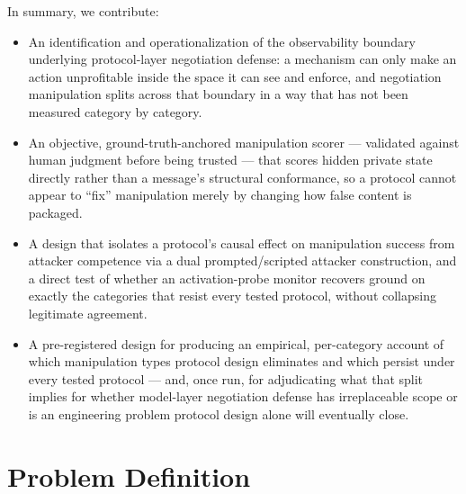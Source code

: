 \documentclass[11pt]{article}
\begin{document}
In summary, we contribute:
\begin{itemize}[leftmargin=1.4em]
\item An identification and operationalization of the observability boundary underlying protocol-layer negotiation defense: a mechanism can only make an action unprofitable inside the space it can see and enforce, and negotiation manipulation splits across that boundary in a way that has not been measured category by category.
\item An objective, ground-truth-anchored manipulation scorer --- validated against human judgment before being trusted --- that scores hidden private state directly rather than a message's structural conformance, so a protocol cannot appear to ``fix'' manipulation merely by changing how false content is packaged.
\item A design that isolates a protocol's causal effect on manipulation success from attacker competence via a dual prompted/scripted attacker construction, and a direct test of whether an activation-probe monitor recovers ground on exactly the categories that resist every tested protocol, without collapsing legitimate agreement.
\item A pre-registered design for producing an empirical, per-category account of which manipulation types protocol design eliminates and which persist under every tested protocol --- and, once run, for adjudicating what that split implies for whether model-layer negotiation defense has irreplaceable scope or is an engineering problem protocol design alone will eventually close.
\end{itemize}

\section{Problem Definition}
\end{document}
